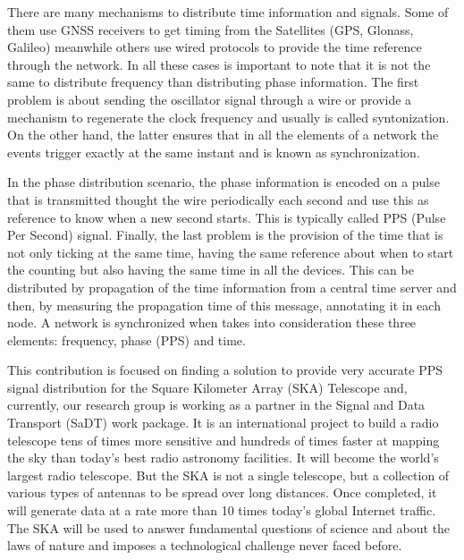 There are many mechanisms to distribute time information and signals. Some of 
them use GNSS receivers to get timing from the Satellites (GPS, Glonass, 
Galileo) meanwhile others use wired protocols to provide the time reference 
through the network. In all these cases is important to note that it is not the 
same to distribute frequency than distributing phase information. The first 
problem is about sending the oscillator signal through a wire or provide a 
mechanism to regenerate the clock frequency and usually is called 
syntonization. On the other hand, the latter ensures that in all the elements 
of a network the events trigger exactly at the same instant and is known as 
synchronization. 

In the phase distribution scenario, the phase information is encoded on a pulse that is transmitted thought the wire periodically each second and use this as reference to know when a new second starts. This is typically called PPS (Pulse Per Second) signal. Finally, the last problem is the provision of the time that is not only ticking at the same time, having the same reference about when to start the counting but also having the same time in all the devices. This can be distributed by propagation of the time information from a central time server and then, by measuring the propagation time of this message, annotating it in each node. A network is synchronized when takes into consideration these three elements: frequency, phase (PPS) and time.

This contribution is focused on finding a solution to provide very accurate PPS 
signal distribution for the Square Kilometer Array (SKA) Telescope 
\cite{ska:project_website} and, currently, our research group is working as a partner in the Signal and Data Transport (SaDT) \cite{ska:sadt_website} work package. It is an international project to build a radio 
telescope tens of times more sensitive and hundreds of times faster at mapping 
the sky than today’s best radio astronomy facilities. It will become the 
world’s largest radio telescope. But the SKA is not a single telescope, but a 
collection of various types of antennas to be spread over long distances. Once 
completed, it will generate data at a rate more than 10 times today’s global 
Internet traffic. The SKA will be used to answer fundamental questions of 
science and about the laws of nature and imposes a technological challenge 
never faced before.

